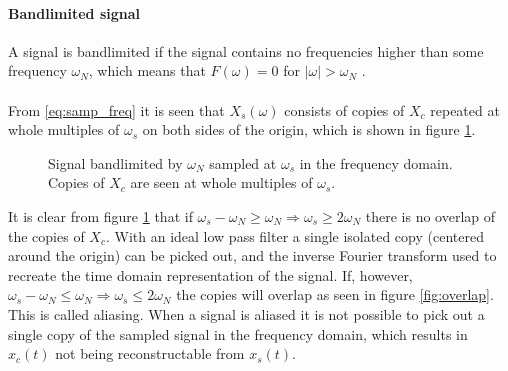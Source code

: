 \paragraph{Bandlimited signal}
A signal is bandlimited if the signal contains no frequencies higher than some frequency $\omega_N$, which means that $F(\omega) = 0$ for $|\omega|>\omega_N$ \cite{FAA}.
\\\\
From \eqref{eq:samp_freq} it is seen that $X_s(\omega)$ consists of copies of $X_c$ repeated at whole multiples of $\omega_s$ on both sides of the origin, which is shown in figure \ref{fig:copies}.
\begin{figure}[H]
\centering
{}
\caption{Signal bandlimited by $\omega_N$ sampled at $\omega_s$ in the frequency domain. Copies of $X_c$ are seen at whole multiples of $\omega_s$.}
\label{fig:copies}
\end{figure}

It is clear from figure \ref{fig:copies} that if $\omega_s-\omega_N\geq \omega_N\Rightarrow \omega_s\geq 2\omega_N$ there is no overlap of the copies of $X_c$. With an ideal low pass filter  a single isolated copy (centered around the origin) can be picked out, and the inverse Fourier transform used to recreate the time domain representation of the signal. If, however, $\omega_s-\omega_N\leq \omega_N\Rightarrow \omega_s\leq 2\omega_N$ the copies will overlap as seen in figure \ref{fig:overlap}. This is called aliasing. When a signal is aliased it is not possible to pick out a single copy of the sampled signal in the frequency domain, which results in $x_c(t)$ not being reconstructable from $x_s(t)$.


